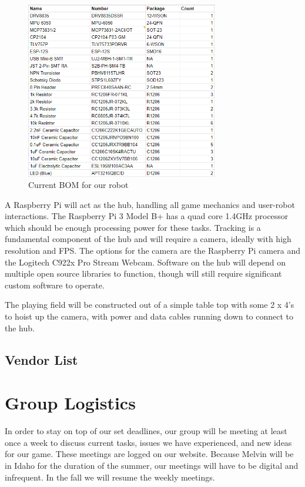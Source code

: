 \documentclass[11pt]{ieeeconf}
\begin{document}
 \begin{figure}[h]
  \centering
  \captionsetup{justification=centering}
      \includegraphics[width=0.75\textwidth]{images/bom.png}
        \caption{Current BOM for our robot}
        \label{robobom}
\end{figure}

A Raspberry Pi will act as the hub, handling all game mechanics and user-robot interactions. The Raspberry Pi 3 Model B+ has a quad core 1.4GHz processor which should be enough processing power for these tasks. Tracking is a fundamental component of the hub and will require a camera, ideally with high resolution and FPS. The options for the camera are the Raspberry Pi camera and the Logitech C922x Pro Stream Webcam. Software on the hub will depend on multiple open source libraries to function, though will still require significant custom software to operate.

The playing field will be constructed out of a simple table top with some 2 x 4's to hoist up the camera, with power and data cables running down to connect to the hub.

\subsection{Vendor List}

\section{Group Logistics}
In order to stay on top of our set deadlines, our group will be meeting at least once a week to discuss current tasks, issues we have experienced, and new ideas for our game. These meetings are logged on our website. Because Melvin will be in Idaho for the duration of the summer, our meetings will have to be digital and infrequent. In the fall we will resume the weekly meetings.
\end{document}
